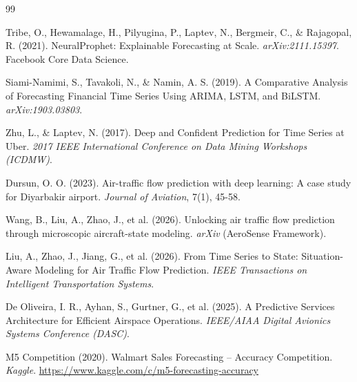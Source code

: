 \documentclass[12pt,a4paper]{article}
\begin{document}
\begin{thebibliography}{99}

Tribe, O., Hewamalage, H., Pilyugina, P., Laptev, N., Bergmeir, C., \& Rajagopal, R. (2021).
\newblock NeuralProphet: Explainable Forecasting at Scale.
\newblock \textit{arXiv:2111.15397}. Facebook Core Data Science.

Siami-Namimi, S., Tavakoli, N., \& Namin, A. S. (2019).
\newblock A Comparative Analysis of Forecasting Financial Time Series Using ARIMA, LSTM, and BiLSTM.
\newblock \textit{arXiv:1903.03803}.

Zhu, L., \& Laptev, N. (2017).
\newblock Deep and Confident Prediction for Time Series at Uber.
\newblock \textit{2017 IEEE International Conference on Data Mining Workshops (ICDMW)}.

Dursun, O. O. (2023).
\newblock Air-traffic flow prediction with deep learning: A case study for Diyarbakir airport.
\newblock \textit{Journal of Aviation}, 7(1), 45-58.

Wang, B., Liu, A., Zhao, J., et al. (2026).
\newblock Unlocking air traffic flow prediction through microscopic aircraft-state modeling.
\newblock \textit{arXiv} (AeroSense Framework).

Liu, A., Zhao, J., Jiang, G., et al. (2026).
\newblock From Time Series to State: Situation-Aware Modeling for Air Traffic Flow Prediction.
\newblock \textit{IEEE Transactions on Intelligent Transportation Systems}.

De Oliveira, I. R., Ayhan, S., Gurtner, G., et al. (2025).
\newblock A Predictive Services Architecture for Efficient Airspace Operations.
\newblock \textit{IEEE/AIAA Digital Avionics Systems Conference (DASC)}.

M5 Competition (2020).
\newblock Walmart Sales Forecasting -- Accuracy Competition.
\newblock \textit{Kaggle}. \url{https://www.kaggle.com/c/m5-forecasting-accuracy}

\end{thebibliography}
\end{document}
